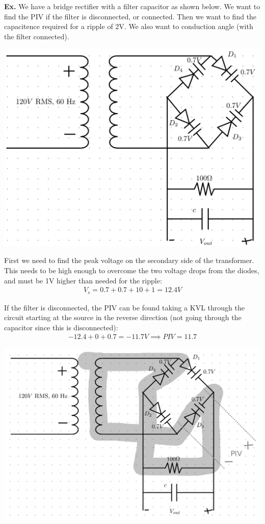 \documentclass[12pt,letterpaper]{article} \usepackage{amsmath} \usepackage{graphicx} \usepackage[margin=1in]{geometry} \usepackage{longtable}  \usepackage{amssymb}
\begin{document}
	\begin{mdframed}[]
		\textbf{Ex. }We have a bridge rectifier with a filter capacitor as shown below. We want to find the PIV if the filter is disconnected, or connected. Then we want to find the capacitence required for a ripple of 2V. We also want to conduction angle (with the filter connected).
		\begin{center}
			\includegraphics[width=0.7\linewidth]{filter-ex}
		\end{center}
		First we need to find the peak voltage on the secondary side of the transformer. This needs to be high enough to overcome the two voltage drops from the diodes, and must be 1V higher than needed for the ripple:
		\begin{align*}
			V_s = 0.7+0.7+10+1=12.4V
		\end{align*}
	
		If the filter is disconnected, the PIV can be found taking a KVL through the circuit starting at the source in the reverse direction (not going through the capacitor since this is disconnected):
		\begin{align*}
			-12.4 + 0 + 0.7 = -11.7V \implies PIV = 11.7
		\end{align*}
		\begin{center}
			\includegraphics[width=0.5\linewidth]{filter-ex1}
		\end{center}
	

\end{mdframed}
\end{document}
